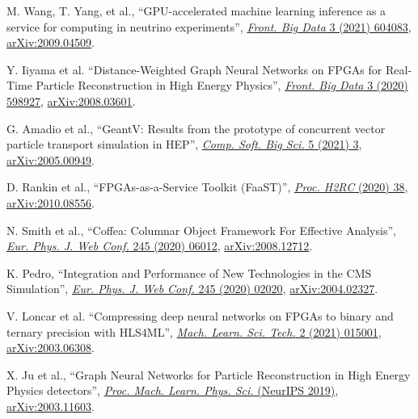 \begin{nbdescription}[leftmargin=12pt,font=\normalfont,labelsep=0em]
\item M. Wang, T. Yang, et al., ``GPU-accelerated machine learning inference as a service for computing in neutrino experiments'', \href{https://doi.org/10.3389/fdata.2020.604083}{\emph{Front. Big Data} 3 (2021) 604083}, \href{https://arxiv.org/abs/2009.04509}{arXiv:2009.04509}. %
\item Y. Iiyama et al. ``Distance-Weighted Graph Neural Networks on FPGAs for Real-Time Particle Reconstruction in High Energy Physics'', \href{https://doi.org/10.3389/fdata.2020.598927}{\emph{Front. Big Data} 3 (2020) 598927}, \href{https://arxiv.org/abs/2008.03601}{arXiv:2008.03601}. %
\item \begin{sloppypar}G. Amadio et al., ``GeantV: Results from the prototype of concurrent vector particle transport simulation in HEP'', \href{https://doi.org/10.1007/s41781-020-00048-6}{\emph{Comp. Soft. Big Sci.} 5 (2021) 3}, \href{https://arxiv.org/abs/2005.00949}{arXiv:2005.00949}.\end{sloppypar} %
\item D. Rankin et al., ``FPGAs-as-a-Service Toolkit (FaaST)'', \href{https://doi.ieeecomputersociety.org/10.1109/H2RC51942.2020.00010}{\emph{Proc. H2RC} (2020) 38}, \href{https://arxiv.org/abs/2010.08556}{arXiv:2010.08556}. %
\item N. Smith et al., ``Coffea: Columnar Object Framework For Effective Analysis'', \href{https://doi.org/10.1051/epjconf/202024506012}{\emph{Eur. Phys. J. Web Conf.} 245 (2020) 06012}, \href{https://arxiv.org/abs/2008.12712}{arXiv:2008.12712}. %
\item K. Pedro, ``Integration and Performance of New Technologies in the CMS Simulation'', \href{https://doi.org/10.1051/epjconf/202024502020}{\emph{Eur. Phys. J. Web Conf.} 245 (2020) 02020}, \href{https://arxiv.org/abs/2004.02327}{arXiv:2004.02327}. %
\item V. Loncar et al. ``Compressing deep neural networks on FPGAs to binary and ternary precision with HLS4ML'', \href{https://doi.org/10.1088/2632-2153/aba042}{\emph{Mach. Learn. Sci. Tech.} 2 (2021) 015001}, \href{https://arxiv.org/abs/2003.06308}{arXiv:2003.06308}. %
\item X. Ju et al., ``Graph Neural Networks for Particle Reconstruction in High Energy Physics detectors'', \href{https://ml4physicalsciences.github.io/2019/#papers}{\emph{Proc. Mach. Learn. Phys. Sci.} (NeurIPS 2019)}, \href{https://arxiv.org/abs/2003.11603}{arXiv:2003.11603}. %

\end{nbdescription}
